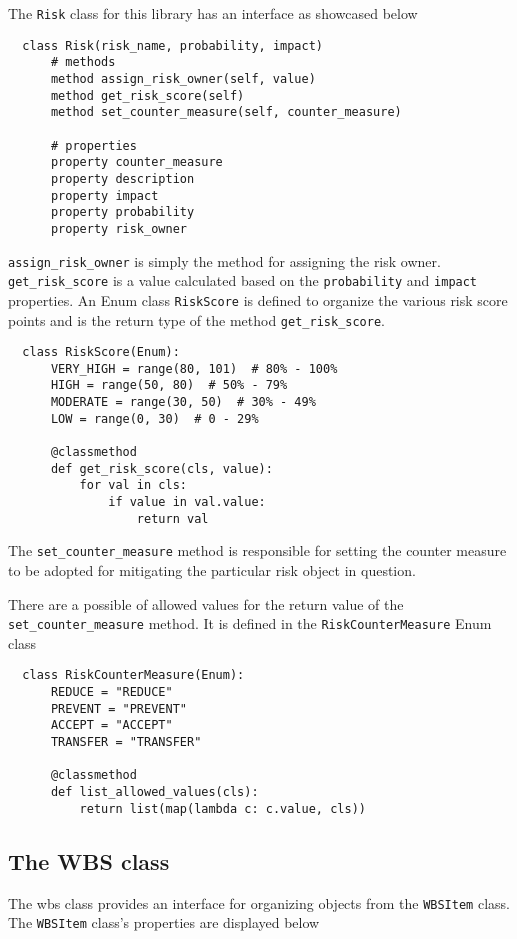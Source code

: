 The \verb+Risk+ class for this library has an interface as showcased below

\begin{lstlisting}
  class Risk(risk_name, probability, impact)
      # methods
      method assign_risk_owner(self, value)
      method get_risk_score(self)
      method set_counter_measure(self, counter_measure)

      # properties
      property counter_measure
      property description
      property impact
      property probability
      property risk_owner
\end{lstlisting}

\verb+assign_risk_owner+ is simply the method for assigning the risk owner. \linebreak \verb+get_risk_score+ is a value calculated based on the \verb+probability+ and \verb+impact+ \linebreak properties. An Enum class \verb+RiskScore+ is defined to organize the various risk score points and is the return type of the method \verb+get_risk_score+.

\begin{lstlisting}
  class RiskScore(Enum):
      VERY_HIGH = range(80, 101)  # 80% - 100%
      HIGH = range(50, 80)  # 50% - 79%
      MODERATE = range(30, 50)  # 30% - 49%
      LOW = range(0, 30)  # 0 - 29%

      @classmethod
      def get_risk_score(cls, value):
          for val in cls:
              if value in val.value:
                  return val
\end{lstlisting}

The \verb+set_counter_measure+ method is responsible for setting the counter measure to be adopted for mitigating the particular risk object in question.

There are a possible of allowed values for the return value of the \verb+set_counter_measure+ method. It is defined in the \verb+RiskCounterMeasure+ Enum class

\begin{lstlisting}
  class RiskCounterMeasure(Enum):
      REDUCE = "REDUCE"
      PREVENT = "PREVENT"
      ACCEPT = "ACCEPT"
      TRANSFER = "TRANSFER"

      @classmethod
      def list_allowed_values(cls):
          return list(map(lambda c: c.value, cls))
\end{lstlisting}


\subsection{The WBS class}
The \ac{wbs} class provides an interface for organizing objects from the \verb+WBSItem+ class. The \verb+WBSItem+ class's properties are displayed below

